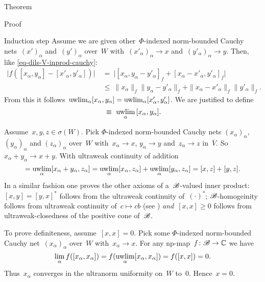 \documentclass[b]{subfiles}
\begin{document}
\begin{parsec}
\begin{point}{Theorem}
\begin{point}{Proof}
\begin{point}{Induction step}
Assume we are given other~$\Phi$-indexed
norm-bounded Cauchy nets~$(x')_\alpha$ and~$(y')_\alpha$ over~$W$
with~$ (x'_\alpha)_\alpha \to x$
and~$ (y'_\alpha)_\alpha \to y$.
Then, like \eqref{eq-dils-V-inprod-cauchy}:
\begin{align*}
    \bigl|f([x_\alpha, y_\alpha] - [x'_\alpha,y'_\alpha])\bigr|
    & \ =\  \bigl| [x_\alpha, y_\alpha - y'_\alpha]_f
        + [x_\alpha - x'_\alpha, y'_\alpha]_f\bigr| \\
    &\  \leq\  \|x_\alpha\|_f \|y_\alpha - y'_\alpha\|_f
        + \|x_\alpha - x'_\alpha\|_f \| y'_\alpha \|_f.
\end{align*}
From this it follows~$ \uwlim_\alpha [x_\alpha,y_\alpha]=
    \uwlim_\alpha [x'_\alpha,y'_\alpha]$.
We are justified to define
\begin{equation*}
    [x,y] \ \equiv\  \uwlim_{\alpha} \,[x_\alpha,y_\alpha].
\end{equation*}

Assume~$x,y,z \in \sigma(W)$.
Pick $\Phi$-indexed
norm-bounded Cauchy nets
$(x_\alpha)_\alpha$, $(y_\alpha)_\alpha$ and $(z_\alpha)_\alpha$ over~$W$
with~$x_\alpha \to x$, $y_\alpha \to y$ and~$z_\alpha \to z$ in~$\overline{V}$.
So~$x_\alpha+ y_\alpha \to x + y.$
With ultraweak continuity of addition
\begin{equation*}
    [x+y,z] = \uwlim_\alpha [x_\alpha +y_\alpha, z_\alpha]
        = \uwlim_\alpha [x_\alpha, z_\alpha] +
                \uwlim_\alpha [y_\alpha, z_\alpha]
                = [x,z] + [y,z].
\end{equation*}
In a similar fashion one proves the other axioms of
    a~$\mathscr{B}$-valued inner product:
    $[x,y]=[y,x]^*$ follows from the ultraweak continuity of~$(\cdot)^*$;
    $\mathscr{B}$-homogeinity follows from
        ultraweak continuity of~$c \mapsto cb$ (see )
        \emph{and}~$[x,x]\geq 0$ follows from ultraweak-closedness of the
        positive cone of~$\mathscr{B}$.

To prove definiteness, assume~$[x,x]=0$.
    Pick some $\Phi$-indexed norm-bounded
        Cauchy net~$(x_\alpha)_\alpha$ over~$W$
        with~$x_\alpha \to x$.
For any np-map~$f\colon \mathscr{B} \to \mathbb{C}$
we have
\begin{equation*}
        \lim_\alpha f([x_\alpha,x_\alpha])
        = f(\uwlim_\alpha [x_\alpha,x_\alpha])
        = f([x,x]) = 0.
\end{equation*}
Thus~$x_\alpha$ converges in the ultranorm uniformity on~$W$ to~$0$.
Hence~$x=0$.


\end{point}
\end{point}
\end{point}
\end{parsec}
\end{document}

